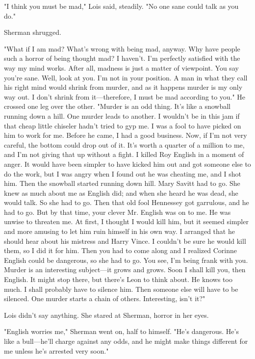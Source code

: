 \documentclass{novel}
\begin{document}
"I think you must be mad," Lois said, steadily. "No one sane could talk as you do."

Sherman shrugged.

"What if I am mad? What's wrong with being mad, anyway. Why have people such a horror of being thought mad? I haven't. I'm perfectly satisfied with the way my mind works. After all, madness is just a matter of viewpoint. You say you're sane. Well, look at you. I'm not in your position. A man in what they call his right mind would shrink from murder, and as it happens murder is my only way out. I don't shrink from it—therefore, I must be mad according to you." He crossed one leg over the other. "Murder is an odd thing. It's like a snowball running down a hill. One murder leads to another. I wouldn't be in this jam if that cheap little chiseler hadn't tried to gyp me. I was a fool to have picked on him to work for me. Before he came, I had a good business. Now, if I'm not very careful, the bottom could drop out of it. It's worth a quarter of a million to me, and I'm not giving that up without a fight. I killed Roy English in a moment of anger. It would have been simpler to have kicked him out and got someone else to do the work, but I was angry when I found out he was cheating me, and I shot him. Then the snowball started running down hill. Mary Savitt had to go. She knew as much about me as English did; and when she heard he was dead, she would talk. So she had to go. Then that old fool Hennessey got garrulous, and he had to go. But by that time, your clever Mr. English was on to me. He was unwise to threaten me. At first, I thought I would kill him, but it seemed simpler and more amusing to let him ruin himself in his own way. I arranged that he should hear about his mistress and Harry Vince. I couldn't be sure he would kill them, so I did it for him. Then you had to come along and I realized Corinne English could be dangerous, so she had to go. You see, I'm being frank with you. Murder is an interesting subject—it grows and grows. Soon I shall kill you, then English. It might stop there, but there's Leon to think about. He knows too much. I shall probably have to silence him. Then someone else will have to be silenced. One murder starts a chain of others. Interesting, isn't it?"

Lois didn't say anything. She stared at Sherman, horror in her eyes.

"English worries me," Sherman went on, half to himself. "He's dangerous. He's like a bull—he'll charge against any odds, and he might make things different for me unless he's arrested very soon."
\end{document}
